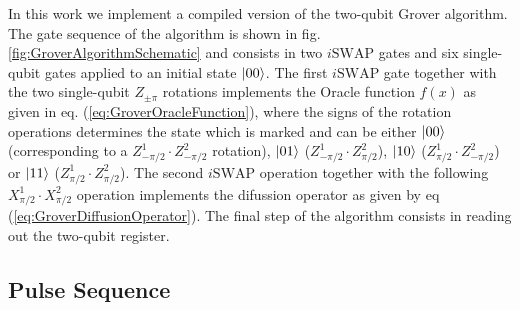 In this work we implement a compiled version of the two-qubit Grover algorithm. The gate sequence of the algorithm is shown in fig. \ref{fig:GroverAlgorithmSchematic} and consists in two $i\mathrm{SWAP}$ gates and six single-qubit gates applied to an initial state $\left| 00 \right>$. The first $i\mathrm{SWAP}$ gate together with the two single-qubit $Z_{\pm \pi}$ rotations implements the Oracle function $f(x)$ as given in eq. (\ref{eq:GroverOracleFunction}), where the signs of the rotation operations determines the state which is marked and can be either $\left| 00 \right>$ (corresponding to a $Z^1_{-\pi/2}\cdot Z^2_{-\pi/2}$ rotation), $\left| 01 \right>$ ($Z^1_{-\pi/2}\cdot Z^2_{\pi/2}$), $\left| 10 \right>$ ($Z^1_{\pi/2}\cdot Z^2_{-\pi/2}$) or $\left| 11 \right>$ ($Z^1_{\pi/2}\cdot Z^2_{\pi/2}$). The second $i\mathrm{SWAP}$ operation together with the following $X^1_{\pi/2}\cdot X^2_{\pi/2}$ operation implements the difussion operator as given by eq (\ref{eq:GroverDiffusionOperator}). The final step of the algorithm consists in reading out the two-qubit register.

\subsection{Pulse Sequence}

